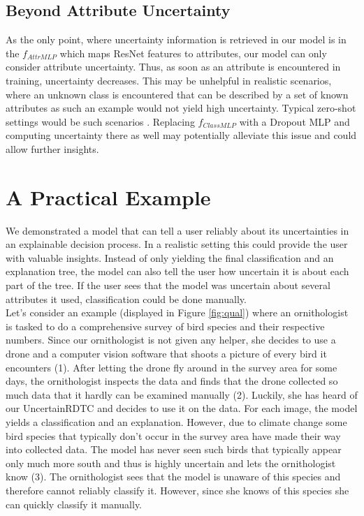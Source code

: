 \documentclass[a4paper,cleardoubleempty,BCOR1cm, 11pt]{report}
\begin{document}
\subsection{Beyond Attribute Uncertainty}\label{sec:attr_uncertainty}
As the only point, where uncertainty information is retrieved in our model is in the $f_{AttrMLP}$ which maps ResNet features to attributes, our model can only consider attribute uncertainty. Thus, as soon as an attribute is encountered in training, uncertainty decreases. This may be unhelpful in realistic scenarios, where an unknown class is encountered that can be described by a set of known attributes as such an example would not yield high uncertainty. Typical zero-shot settings would be such scenarios \cite{8413121}. Replacing $f_{ClassMLP}$ with a Dropout MLP and computing uncertainty there as well may potentially alleviate this issue and could allow further insights.




\section{A Practical Example}
We demonstrated a model that can tell a user reliably about its uncertainties in an explainable decision process. In a realistic setting this could provide the user with valuable insights. Instead of only yielding the final classification and an explanation tree, the model can also tell the user how uncertain it is about each part of the tree. If the user sees that the model was uncertain about several attributes it used, classification could be done manually.\\
Let's consider an example (displayed in Figure \ref{fig:qual}) where an ornithologist is tasked to do a comprehensive survey of bird species and their respective numbers. Since our ornithologist is not given any helper, she decides to use a drone and a computer vision software that shoots a picture of every bird it encounters (1). After letting the drone fly around in the survey area for some days, the ornithologist inspects the data and finds that the drone collected so much data that it hardly can be examined manually (2). Luckily, she has heard of our UncertainRDTC and decides to use it on the data. For each image, the model yields a classification and an explanation. However, due to climate change some bird species that typically don't occur in the survey area have made their way into collected data. The model has never seen such birds that typically appear only much more south and thus is highly uncertain and lets the ornithologist know (3). The ornithologist sees that the model is unaware of this species and therefore cannot reliably classify it. However, since she knows of this species she can quickly classify it manually.
\end{document}
